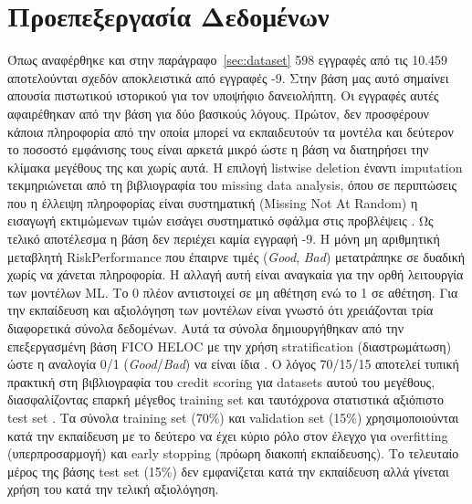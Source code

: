 \section{Προεπεξεργασία Δεδομένων}
\label{sec:preprocessing}
Όπως αναφέρθηκε και στην παράγραφο~\ref{sec:dataset} 598 εγγραφές από τις 10.459 
αποτελούνται σχεδόν αποκλειστικά από εγγραφές -9. Στην βάση μας αυτό σημαίνει 
απουσία πιστωτικού ιστορικού για τον υποψήφιο δανειολήπτη. Οι εγγραφές αυτές 
αφαιρέθηκαν από την βάση για δύο βασικούς λόγους. Πρώτον, δεν προσφέρουν κάποια 
πληροφορία από την οποία μπορεί να εκπαιδευτούν τα μοντέλα και δεύτερον το ποσοστό 
εμφάνισης τους είναι αρκετά μικρό ώστε η βάση να διατηρήσει την κλίμακα μεγέθους 
της και χωρίς αυτά. Η επιλογή listwise deletion έναντι imputation τεκμηριώνεται από τη βιβλιογραφία 
του missing data analysis, όπου σε περιπτώσεις που η έλλειψη πληροφορίας είναι 
συστηματική (Missing Not At Random) η εισαγωγή εκτιμώμενων τιμών εισάγει 
συστηματικό σφάλμα στις προβλέψεις \citep{little2019statistical, vanbuuren2018flexible}.
Ως τελικό αποτέλεσμα η βάση δεν περιέχει καμία εγγραφή -9. 
Η μόνη μη αριθμητική μεταβλητή RiskPerformance που έπαιρνε τιμές (\textit{Good}, 
\textit{Bad}) μετατράπηκε σε δυαδική χωρίς να χάνεται πληροφορία. Η αλλαγή αυτή 
είναι αναγκαία για την ορθή λειτουργία των μοντέλων ML. Το 0 πλέον αντιστοιχεί 
σε μη αθέτηση ενώ το 1 σε αθέτηση. Για την εκπαίδευση και αξιολόγηση των μοντέλων 
είναι γνωστό ότι χρειάζονται τρία διαφορετικά σύνολα δεδομένων. Αυτά τα σύνολα 
δημιουργήθηκαν από την επεξεργασμένη βάση FICO HELOC με την χρήση stratification 
(διαστρωμάτωση) ώστε η αναλογία 0/1 (\textit{Good}/\textit{Bad}) να είναι ίδια \citep{kohavi1995study}. 
Ο λόγος 70/15/15 αποτελεί τυπική πρακτική στη βιβλιογραφία του credit scoring για datasets αυτού του μεγέθους, 
διασφαλίζοντας επαρκή μέγεθος training set και ταυτόχρονα στατιστικά αξιόπιστο test set \citep{lessmann2015benchmarking}.
Τα σύνολα training set (70\%) και validation set (15\%) χρησιμοποιούνται κατά την 
εκπαίδευση με το δεύτερο να έχει κύριο ρόλο στον έλεγχο για overfitting 
(υπερπροσαρμογή) και early stopping (πρόωρη διακοπή εκπαίδευσης). Το τελευταίο 
μέρος της βάσης test set (15\%) δεν εμφανίζεται κατά την εκπαίδευση αλλά γίνεται 
χρήση του κατά την τελική αξιολόγηση.


